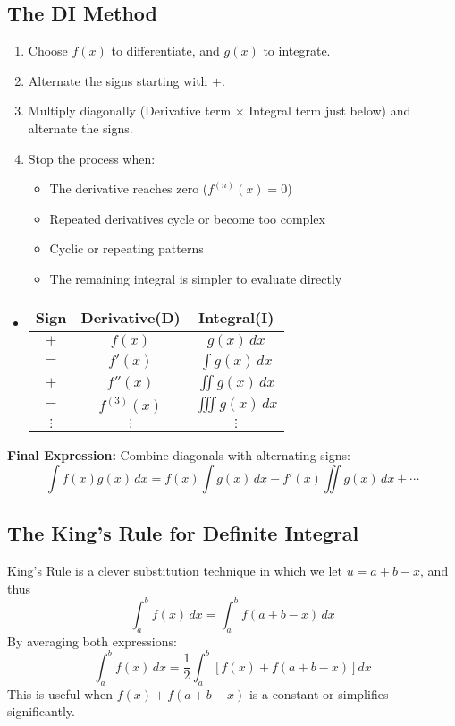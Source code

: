 \documentclass[11pt]{article}
\begin{document}
\subsection{The DI Method}
\begin{enumerate}
    \item Choose $f(x)$ to differentiate, and $g(x)$ to integrate.
    \item Alternate the signs starting with $+$.
    \item Multiply diagonally (Derivative term $\times$ Integral term just below) and alternate the signs.
    \item Stop the process when:
        \begin{itemize}
            \item The derivative reaches zero ($f^{(n)}(x) = 0$)
            \item Repeated derivatives cycle or become too complex
            \item Cyclic or repeating patterns
            \item The remaining integral is simpler to evaluate directly
        \end{itemize}
\end{enumerate}
\begin{itemize}
    \renewcommand{\labelitemi}{~}
    \item 
        \renewcommand{\arraystretch}{2}
        \begin{tabular}{c|c|c}
            \textbf{Sign} & \textbf{Derivative(D)} & \textbf{Integral(I)} \\
            \hline
            $+$ \qquad& $f(x)$         \qquad& $ g(x) \, dx$ \\
            $-$ \qquad& $f'(x)$        \qquad& $\int g(x) \, dx$ \\
            $+$ \qquad& $f''(x)$       \qquad& $\iint g(x) \, dx$ \\
            $-$ \qquad& $f^{(3)}(x)$   \qquad& $\iiint g(x) \, dx$ \\
            $\vdots$ & $\vdots$ & $\vdots$ \\
        \end{tabular}
\end{itemize}
\textbf{Final Expression:} Combine diagonals with alternating signs:
\[
    \int f(x) g(x) \, dx = f(x) \int g(x)\,dx - f'(x) \iint g(x)\,dx + \cdots
\]
\subsection{The King's Rule for Definite Integral}
King's Rule is a clever substitution technique in which we let $u=a+b-x$, and thus
\[
    \boxed{
        \int_a^b f(x)\,dx = \int_a^b f(a + b - x)\,dx
    }
\]By averaging both expressions:
\[
    \int_a^b f(x)\,dx = \frac{1}{2} \int_a^b \left[ f(x) + f(a + b - x) \right] dx
\]This is useful when $f(x) + f(a + b - x)$ is a constant or simplifies significantly.
\end{document}
